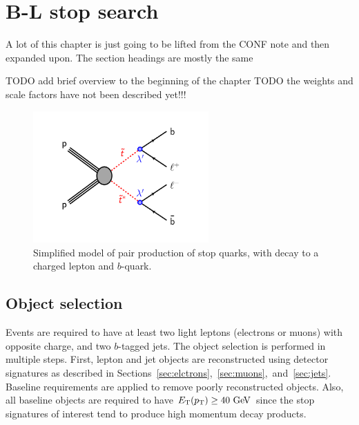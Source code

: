 \chapter[B-L stop search][B-L stop search]{B-L stop search}
\label{ch:bl_stop}

{\color{red}A lot of this chapter is just going to be lifted from the CONF note
  and then expanded upon. The section headings are mostly the same}

{\color{red} TODO add brief overview to the beginning of the chapter}
{\color{red} TODO the weights and scale factors have not been described yet!!!}

\begin{figure}[ht]
  \centering
  \includegraphics[width=0.60\textwidth]{figs/blstop/b_minus_l_stop_stop.pdf}
  \caption{Simplified model of pair production of stop quarks, with decay to a
    charged lepton and $b$-quark.
  }
  \label{fig:blstop_diagram}
\end{figure}

\section{Object selection}
\label{sec:object_selection}

Events are required to have at least two light leptons (electrons or muons)
with opposite charge, and two $b$-tagged jets.
The object selection is performed in multiple steps. First, lepton and jet
objects are reconstructed using detector signatures as described in
Sections~\ref{sec:elctrons},~\ref{sec:muons},~and~\ref{sec:jets}.
Baseline requirements are applied to remove poorly reconstructed objects.
Also, all baseline objects are required to have $\ET(\pt) \geq 40 \GeV$ since the
stop signatures of interest tend to produce high momentum decay products.

